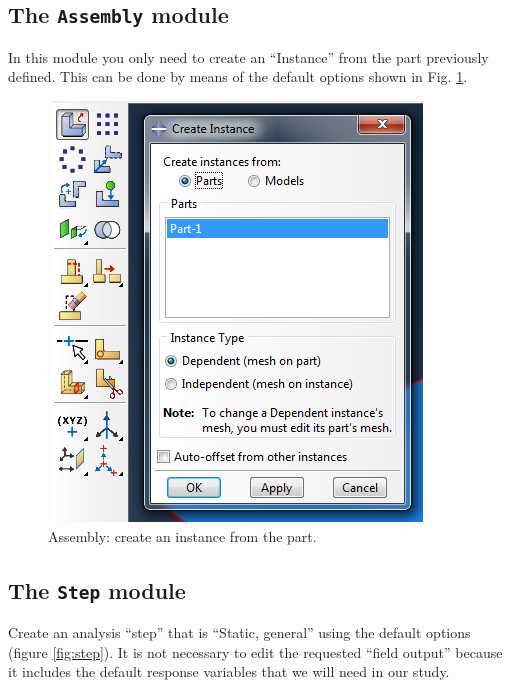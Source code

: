 \documentclass[spanish,a4paper,12pt]{article}
\begin{document}
\subsection{The \texttt{Assembly} module}

In this module you only need to create an ``Instance'' from the part previously defined. This can be done by means of the default options shown in Fig. \ref{fig:assembly}.


\begin{figure}[h!tp]
\centering
\includegraphics[scale=0.4]{capturas/14-assembly.png}
\caption{Assembly: create an instance from the part.}
\label{fig:assembly}
\end{figure}

\subsection{The \texttt{Step} module}

Create an analysis ``step'' that is ``Static, general'' using the default options (figure \ref{fig:step}). 
It is not necessary to edit the requested ``field output'' because it includes the default response variables that we will need in our study.
\end{document}
